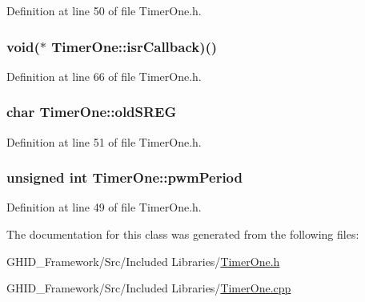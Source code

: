 \-Definition at line 50 of file \-Timer\-One.\-h.

\hypertarget{class_timer_one_aeed829a3f938c613579c10a015a3d1cb}{
\subsubsection[{isr\-Callback}]{\setlength{\rightskip}{0pt plus 5cm}void($\ast$ {\bf \-Timer\-One\-::isr\-Callback})()}}\label{class_timer_one_aeed829a3f938c613579c10a015a3d1cb}


\-Definition at line 66 of file \-Timer\-One.\-h.

\hypertarget{class_timer_one_ac71182fc3a2e44efbc796eb5260d3007}{
\subsubsection[{old\-S\-R\-E\-G}]{\setlength{\rightskip}{0pt plus 5cm}char {\bf \-Timer\-One\-::old\-S\-R\-E\-G}}}\label{class_timer_one_ac71182fc3a2e44efbc796eb5260d3007}


\-Definition at line 51 of file \-Timer\-One.\-h.

\hypertarget{class_timer_one_a6e5edd460d36e9c5c57cf647e86a3902}{
\subsubsection[{pwm\-Period}]{\setlength{\rightskip}{0pt plus 5cm}unsigned int {\bf \-Timer\-One\-::pwm\-Period}}}\label{class_timer_one_a6e5edd460d36e9c5c57cf647e86a3902}


\-Definition at line 49 of file \-Timer\-One.\-h.



\-The documentation for this class was generated from the following files\-:\begin{DoxyCompactItemize}
\item 
\-G\-H\-I\-D\-\_\-\-Framework/\-Src/\-Included Libraries/\hyperlink{_timer_one_8h}{\-Timer\-One.\-h}\item 
\-G\-H\-I\-D\-\_\-\-Framework/\-Src/\-Included Libraries/\hyperlink{_timer_one_8cpp}{\-Timer\-One.\-cpp}\end{DoxyCompactItemize}
